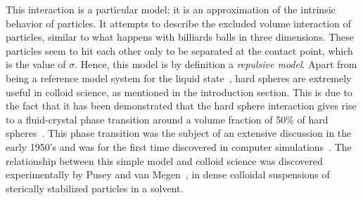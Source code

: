 This interaction is a particular model; it is an approximation of the intrinsic
behavior of particles.
It attempts to describe the excluded volume interaction of particles, similar to what
happens with billiards balls in three dimensions.
These particles seem to hit each other only to be separated at the contact point, which
is the value of $\sigma$. Hence, this model is by definition a \emph{repulsive model}.
Apart from being a reference model system for the liquid
state~\cite{hansenTheorySimpleLiquids2013}, hard spheres are extremely useful in
colloid science, as mentioned in the introduction section. This is due to the fact
that it has been demonstrated that the hard sphere interaction gives rise to a
fluid-crystal phase transition around a volume fraction of 50\% of hard 
spheres~\cite{hooverMeltingTransitionCommunal1968a,gastSimpleOrderingComplex1998,roblesNoteEquationState2014a}.
This phase transition was the subject of an extensive discussion in the early
1950's and was for the first time discovered in computer
simulations~\cite{alderPhaseTransitionHard1957a}.
The relationship between this simple model and colloid science was discovered
experimentally by Pusey and van Megen~\cite{puseyPhaseBehaviourConcentrated1986},
in dense colloidal suspensions of sterically stabilized particles in a solvent.

